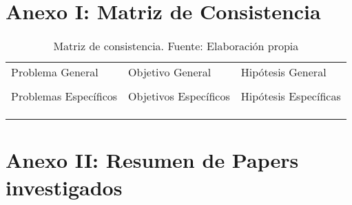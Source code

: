 \chapter{Anexo I: Matriz de Consistencia}


\begin{table}[h!]
	\centering
	\small
	\begin{tabular}{ |m{5cm}|m{5cm}|m{5cm}|  }
		\hline
		\rowcolor{bluejean}
		\Centering \color{white}{PROBLEMAS}& \Centering \color{white}{OBJETIVOS}& \Centering \color{white}{HIPÓTESIS}\\
		\hline
		\rowcolor{turq}
		\Centering Problema General& \Centering Objetivo General & \Centering Hipótesis General \\
		\hline
		{\ProblemaGeneral} & { \ObjetivoGeneral} & {\HipotesisGeneral} \\
		\hline
		\rowcolor{turq}
		\Centering Problemas Específicos& \Centering Objetivos Específicos & \Centering Hipótesis Específicas \\
		\hline
		{\Pbone} & {\Objone} & {\Hone} \\
		\hline
		{\Pbtwo} & {\Objtwo} & {\Htwo} \\
		\hline
		{\Pbthree} & {\Objthree} & {\Hthree} \\
		\hline
	\end{tabular}
	\caption{Matriz de consistencia. Fuente: Elaboración propia}
	\label{1:table}
\end{table}



\chapter{Anexo II: Resumen de Papers investigados}

